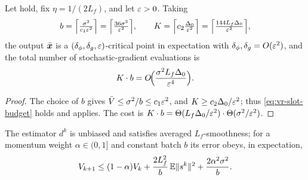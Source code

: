 \begin{corollary}
\label{cor:vr-sgd-rate}
Let  hold, fix $\eta=1/(2L_f)$, and let $\varepsilon>0$. Taking
\[
    b=\Bigl\lceil\tfrac{\sigma^2}{c_1\varepsilon^2}\Bigr\rceil
     =\Bigl\lceil\tfrac{36\sigma^2}{\varepsilon^2}\Bigr\rceil,
    \qquad
    K=\Bigl\lceil c_2\tfrac{\Delta_0}{\varepsilon^2}\Bigr\rceil
     =\Bigl\lceil\tfrac{144L_f\Delta_0}{\varepsilon^2}\Bigr\rceil,
\]
the output $\bar{\bm{x}}$ is a $(\delta_\phi,\delta_g,\varepsilon)$-critical point in
expectation with $\delta_\phi,\delta_g=O(\varepsilon^2)$, and the total number of
stochastic-gradient evaluations is
\[
    K\cdot b=O\!\Bigl(\frac{\sigma^2 L_f\Delta_0}{\varepsilon^4}\Bigr).
\]
\end{corollary}

\begin{proof}
The choice of $b$ gives $\bar V\le\sigma^2/b\le c_1\varepsilon^2$, and
$K\ge c_2\Delta_0/\varepsilon^2$; thus \eqref{eq:vr-slot-budget} holds and
 applies. The cost is
$K\cdot b=\Theta(L_f\Delta_0/\varepsilon^2)\cdot\Theta(\sigma^2/\varepsilon^2)$.
\end{proof}

\begin{assumption}
\label{asm:vr-mvr}
The estimator $d^k$ is unbiased and satisfies averaged $L_f$-smoothness; for a
momentum weight $\alpha\in(0,1]$ and constant batch $b$ its error obeys, in
expectation,
\begin{equation}
    V_{k+1}\le(1-\alpha)V_k
            +\frac{2L_f^2}{b}\,\mathbb{E}\lVert s^k\rVert^2
            +\frac{2\alpha^2\sigma^2}{b}.
    \label{eq:vr-mvr-recursion}
\end{equation}
\end{assumption}

